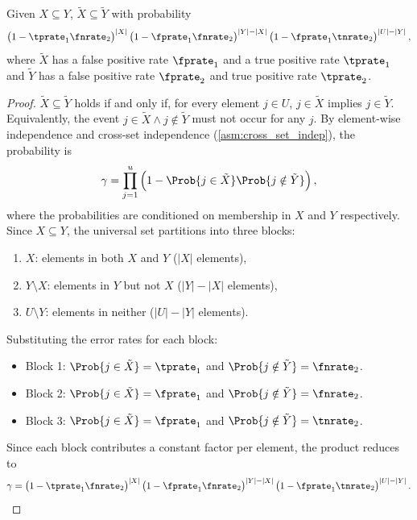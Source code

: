 \begin{theorem}
Given $X \subseteq Y$, $\tilde{X} \subseteq \tilde{Y}$ with probability
\begin{equation}
	\left(1 - \tprate_1\fnrate_2\right)^{|X|}
	\left(1 - \fprate_1\fnrate_2\right)^{|Y| - |X|}
	\left(1 - \fprate_1\tnrate_2\right)^{|U| - |Y|},
\end{equation}
where $\tilde{X}$ has a false positive rate $\fprate_1$ and a true positive rate $\tprate_1$ and $\tilde{Y}$ has a false positive rate $\fprate_2$ and true positive rate $\tprate_2$.
\end{theorem}
\begin{proof}
	$\tilde{X} \subseteq \tilde{Y}$ holds if and only if, for every element $j \in U$, $j \in \tilde{X}$ implies $j \in \tilde{Y}$.
	Equivalently, the event $j \in \tilde{X} \land j \notin \tilde{Y}$ must not occur for any $j$.
	By element-wise independence and cross-set independence (\cref{asm:cross_set_indep}), the probability is
	\begin{equation}
	\gamma = \prod_{j=1}^{u} \left(1 - \Prob{j \in \tilde{X}} \Prob{j \notin \tilde{Y}}\right),
	\end{equation}
	where the probabilities are conditioned on membership in $X$ and $Y$ respectively.
	Since $X \subseteq Y$, the universal set partitions into three blocks:
	\begin{enumerate}
		\item $X$: elements in both $X$ and $Y$ ($|X|$ elements),
		\item $Y \setminus X$: elements in $Y$ but not $X$ ($|Y| - |X|$ elements),
		\item $U \setminus Y$: elements in neither ($|U| - |Y|$ elements).
	\end{enumerate}
	Substituting the error rates for each block:
	\begin{itemize}
		\item Block 1: $\Prob{j \in \tilde{X}} = \tprate_1$ and $\Prob{j \notin \tilde{Y}} = \fnrate_2$.
		\item Block 2: $\Prob{j \in \tilde{X}} = \fprate_1$ and $\Prob{j \notin \tilde{Y}} = \fnrate_2$.
		\item Block 3: $\Prob{j \in \tilde{X}} = \fprate_1$ and $\Prob{j \notin \tilde{Y}} = \tnrate_2$.
	\end{itemize}
	Since each block contributes a constant factor per element, the product reduces to
	\begin{equation}
	\gamma =
	\left(1 - \tprate_1 \fnrate_2\right)^{|X|}
	\left(1 - \fprate_1 \fnrate_2\right)^{|Y| - |X|}
	\left(1 - \fprate_1 \tnrate_2\right)^{|U| - |Y|}.
	\qedhere
	\end{equation}
\end{proof}

